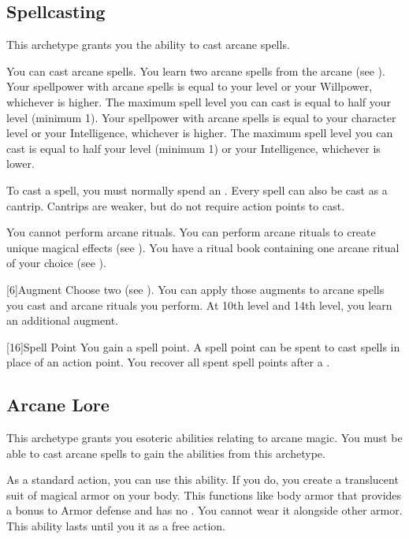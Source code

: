     \subsection{Spellcasting}
        This archetype grants you the ability to cast arcane spells.

        You can cast arcane spells.
        You learn two arcane spells from the arcane  (see ).
         Your spellpower with arcane spells is equal to your level or your Willpower, whichever is higher.
        The maximum spell level you can cast is equal to half your level (minimum 1).
         Your spellpower with arcane spells is equal to your character level or your Intelligence, whichever is higher.
        The maximum spell level you can cast is equal to half your level (minimum 1) or your Intelligence, whichever is lower.

        To cast a spell, you must normally spend an .
        Every spell can also be cast as a cantrip.
        Cantrips are weaker, but do not require action points to cast.

         You cannot perform arcane rituals.
         You can perform arcane rituals to create unique magical effects (see ).
        You have a ritual book containing one arcane ritual of your choice (see ).

        [6]{Augment}
        Choose two  (see ).
        You can apply those augments to arcane spells you cast and arcane rituals you perform.
        At 10th level and 14th level, you learn an additional augment.

        [16]{Spell Point}
        You gain a spell point.
        A spell point can be spent to cast spells in place of an action point.
        You recover all spent spell points after a .

    \subsection{Arcane Lore}
        This archetype grants you esoteric abilities relating to arcane magic.
        You must be able to cast arcane spells to gain the abilities from this archetype.

         As a standard action, you can use this ability.
        If you do, you create a translucent suit of magical armor on your body.
        This functions like body armor that provides a  bonus to Armor defense and has no .
        You cannot wear it alongside other armor.
        This ability lasts until you  it as a free action.

